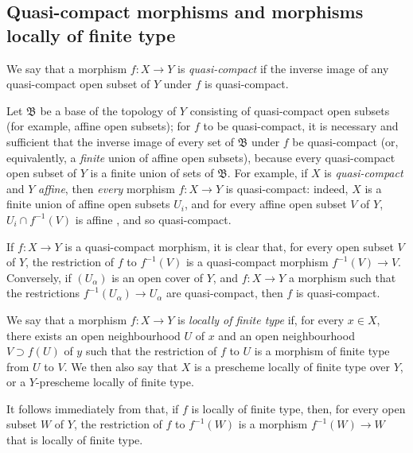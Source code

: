 \subsection{Quasi-compact morphisms and morphisms locally of finite type}
\label{subsection:I.6.6}

\begin{definition}[6.6.1]
\label{I.6.6.1}
We say that a morphism $f:X\to Y$ is \emph{quasi-compact} if the inverse image of any quasi-compact open subset of $Y$ under $f$ is quasi-compact.
\end{definition}

Let $\mathfrak{B}$ be a base of the topology of $Y$ consisting of quasi-compact open subsets (for example, affine open subsets);
for $f$ to be quasi-compact, it is necessary and sufficient that the inverse image of every set of $\mathfrak{B}$ under $f$ be quasi-compact (or, equivalently, a \emph{finite} union of affine open subsets), because every quasi-compact open subset of $Y$ is a finite union of sets of $\mathfrak{B}$.
For example, if $X$ is \emph{quasi-compact} and $Y$ \emph{affine}, then \emph{every} morphism $f: X\to Y$ is quasi-compact:
indeed, $X$ is a finite union of affine open subsets $U_i$, and for every affine open subset $V$ of $Y$, $U_i\cap f^{-1}(V)$ is affine , and so quasi-compact.

If $f: X\to Y$ is a quasi-compact morphism, it is clear that, for every open subset $V$ of $Y$, the restriction of $f$ to $f^{-1}(V)$ is a quasi-compact morphism $f^{-1}(V)\to V$.
Conversely, if $(U_\alpha)$ is an open cover of $Y$, and $f: X\to Y$ a morphism such that the restrictions $f^{-1}(U_\alpha)\to U_\alpha$ are quasi-compact, then $f$ is quasi-compact.

\begin{definition}[6.6.2]
\label{I.6.6.2}
We say that a morphism $f: X\to Y$ is \emph{locally of finite type} if, for every $x\in X$, there exists an open neighbourhood $U$ of $x$ and an open neighbourhood $V\supset f(U)$ of $y$ such that the restriction of $f$ to $U$ is a morphism of finite type from $U$ to $V$.
We then also say that $X$ is a prescheme locally of finite type over $Y$, or a $Y$-prescheme locally of finite type.
\end{definition}

It follows immediately from  that, if $f$ is locally of finite type, then, for every open subset $W$ of $Y$, the restriction of $f$ to $f^{-1}(W)$ is a morphism $f^{-1}(W)\to W$ that is locally of finite type.

